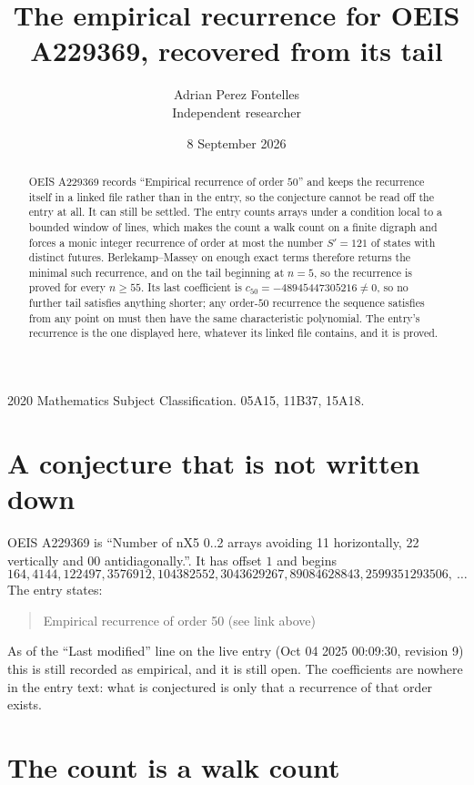 \documentclass[11pt,a4paper]{article}
\title{The empirical recurrence for OEIS A229369, recovered from its tail}
\author{Adrian Perez Fontelles\\ \small Independent researcher}
\date{8 September 2026}
\theoremstyle{plain}
\theoremstyle{definition}
\begin{document}
\maketitle

\begin{abstract}
OEIS A229369 records ``Empirical recurrence of order $50$'' and keeps the recurrence itself in
a linked file rather than in the entry, so the conjecture cannot be read off the entry at all.
It can still be settled. The entry counts arrays under a condition local to a bounded window of
lines, which makes the count a walk count on a finite digraph and forces a monic integer
recurrence of order at most the number $S'=121$ of states with distinct futures. Berlekamp--Massey on
enough exact terms therefore returns the minimal such recurrence, and on the tail beginning at $n=5$, so the recurrence is proved for every $n\ge55$.
Its last coefficient is $c_{50}=-48945447305216\neq0$, so no further tail satisfies anything
shorter; any order-$50$ recurrence the sequence satisfies from any point on must then have
the same characteristic polynomial. The entry's recurrence is the one displayed here, whatever
its linked file contains, and it is proved.
\end{abstract}

\noindent\small 2020 Mathematics Subject Classification. 05A15, 11B37, 15A18.\normalsize

\section{A conjecture that is not written down}

OEIS A229369 is ``Number of nX5 0..2 arrays avoiding 11 horizontally, 22 vertically and 00 antidiagonally.''. It has offset $1$ and begins
\[
164, 4144, 122497, 3576912, 104382552, 3043629267, 89084628843, 2599351293506,\ \dots
\]
The entry states:
\begin{quote}
Empirical recurrence of order 50 (see link above)
\end{quote}
As of the ``Last modified'' line on the live entry (Oct 04 2025 00:09:30, revision 9)
this is still recorded as empirical, and it is still open. The coefficients are nowhere in the
entry text: what is conjectured is only that a recurrence of that order exists.

\section{The count is a walk count}
\end{document}
